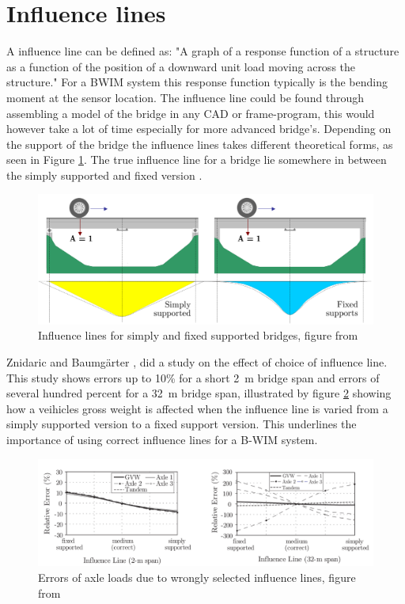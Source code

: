 \section{Influence lines}
A influence line can be defined as: "A graph of a response function of a structure as a function of the position of a downward unit load moving across the structure."
For a BWIM system this response function typically is the bending moment at the sensor location.
The influence line could be found through assembling a model of the bridge in any CAD or frame-program, this would however take a lot of time especially for more advanced bridge's. Depending on the support of the bridge the influence lines takes different theoretical forms, as seen in Figure \ref{fig:theoreticalInfl}. The true influence line for a bridge lie somewhere in between the simply supported and fixed version \cite[p.~146]{bwim_an_overview}.
\begin{figure}[h]
\centering
\includegraphics[width=\textwidth]{figures/inflLinesQuilligan}
\caption{Influence lines for simply and fixed supported bridges, figure from \cite{Quilligan}}
\label{fig:theoreticalInfl}
\end{figure}

Znidaric and Baumgärter \cite{bwim_an_overview}, did a study on the effect of choice of influence line. This study shows errors up to 10\% for a short \SI{2}{\metre} bridge span and errors of several hundred percent for a \SI{32}{\metre} bridge span, illustrated by figure \ref{fig:errorOfInfl} showing how a veihicles gross weight is affected when the influence line is varied from a simply supported version to a fixed support version. This underlines the importance of using correct influence lines for a B-WIM system.
\begin{figure}[h]
	\begin{adjustbox}{center}
		\includegraphics[width=1.2\textwidth]{figures/error_in_weights_dueTo_infl}
	\end{adjustbox}
\caption{Errors of axle loads due to wrongly selected influence lines, figure from \cite{Quilligan}}
\label{fig:errorOfInfl}
\end{figure}

